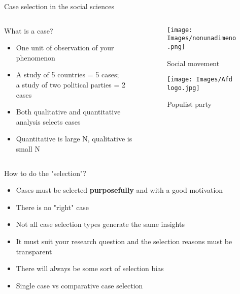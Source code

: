 \documentclass[10pt, aspectratio=169]{beamer}
\begin{document}
\begin{frame}{Case selection in the social sciences}
\begin{columns}
\begin{column}{0.5\textwidth}
What is a case? \vspace{0.3cm}
\begin{itemize}
    \item One unit of observation  of your phenomenon \vspace{0.3cm}
    \item A study of 5 countries = 5 cases; \\ a study of two political parties = 2 cases \vspace{0.3cm}
    \item Both qualitative and quantitative analysis selects cases \vspace{0.3cm}
    \item Quantitative is large N, qualitative is small N \vspace{0.3cm}
\end{itemize}
\end{column}

\begin{column}{0.5\textwidth}
\begin{figure}
    \centering
    \texttt{[image: Images/nonunadimeno.png]}
    \caption{Social movement}
    \label{fig:enter-label}
\end{figure}
\begin{figure}
    \centering
    \texttt{[image: Images/Afd logo.jpg]}
    \caption{Populist party}
    \label{fig:enter-label}
\end{figure}
\end{column}
\end{columns}
\end{frame}

\begin{frame}{How to do the "selection"?}
\begin{itemize}
    \item Cases must be selected \textbf{purposefully} and with a good motivation \vspace{0.3cm}
    \item There is no "right" case\vspace{0.3cm}
    \item Not all case selection types generate the same insights\vspace{0.3cm}
    \item It must suit your research question and the selection reasons must be transparent\vspace{0.3cm}
    \item There will always be some sort of selection bias \vspace{0.3cm}
    \item Single case vs comparative case selection
\end{itemize}
\end{frame}
\end{document}
